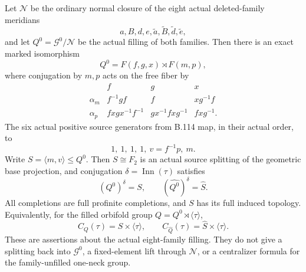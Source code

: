 Let $\mathcal N$ be the ordinary normal closure of the eight actual
deleted-family meridians
\[
 a,B,d,e,\widetilde a,\widetilde B,\widetilde d,\widetilde e,
\]
and let $Q^0=\mathcal G^0/\mathcal N$ be the actual filling of
both families. Then there is an exact marked isomorphism
\begin{equation}\label{eq:B119-filled-semidirect}
 Q^0=F(f,g,x)\rtimes F(m,p),
\end{equation}
where conjugation by $m,p$ acts on the free fiber by
\begin{equation}\label{eq:B119-base-actions}
 \begin{array}{c|ccc}
       &f&g&x\\ \hline
 \alpha_m&f^{-1}gf&f&xg^{-1}f\\
 \alpha_p&fxgx^{-1}f^{-1}&gx^{-1}fxg^{-1}&fxg^{-1}.
 \end{array}
\end{equation}
The six actual positive source generators from B.114 map, in their
actual order, to
\begin{equation}\label{eq:B119-source-images}
 1,\ 1,\ 1,\ 1,\ v=f^{-1}p,\ m.
\end{equation}
Write $S=\langle m,v\rangle\leq Q^0$. Then $S\cong F_2$ is an
actual source splitting of the geometric base projection, and
conjugation $\delta=\operatorname{Inn}(\tau)$ satisfies
\begin{equation}\label{eq:B119-fixed-equalities}
 (Q^0)^\delta=S,
 \qquad (\widehat{Q^0})^\delta=\widehat S.
\end{equation}
All completions are full profinite completions, and $S$ has its full
induced topology. Equivalently, for the filled orbifold group
$Q=Q^0\rtimes\langle\tau\rangle$,
\begin{equation}\label{eq:B119-orbifold-centralizers}
 C_Q(\tau)=S\times\langle\tau\rangle,
 \qquad
 C_{\widehat Q}(\tau)=\widehat S\times\langle\tau\rangle.
\end{equation}
These are assertions about the actual eight-family filling. They do
not give a splitting back into $\mathcal G^0$, a fixed-element lift
through $\mathcal N$, or a centralizer formula for the family-unfilled
one-neck group.

